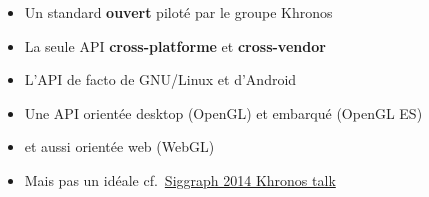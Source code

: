 \begin{frame}
\begin{columns}
\begin{column}{.2\textwidth}
\begin{center}
      \end{center}
    \end{column}
    \begin{column}{.8\textwidth}
      \begin{itemize}
      \item Un standard \textbf{ouvert} piloté par le groupe Khronos
      \item La seule API \textbf{cross-platforme} et \textbf{cross-vendor} %
      \item L'API de facto de GNU/Linux et d'Android
      \item Une API orientée desktop (OpenGL) et embarqué (OpenGL ES)
      \item et aussi orientée web (WebGL)
      \item \alert{Mais pas un idéale} cf.\ \href{https://www.khronos.org/assets/uploads/developers/library/2014-siggraph-bof/OpenGL-Ecosystem-BOF_Aug14.pdf}{Siggraph 2014 Khronos talk}
      \end{itemize}
    \end{column}
  \end{columns}
\end{frame}

